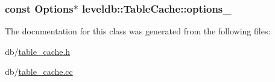 \subsubsection[{options\+\_\+}]{\setlength{\rightskip}{0pt plus 5cm}const {\bf Options}$\ast$ leveldb\+::\+Table\+Cache\+::options\+\_\+\hspace{0.3cm}{\ttfamily [private]}}\label{classleveldb_1_1_table_cache_ad24157b076d23fc18fe90d530241fd23}


The documentation for this class was generated from the following files\+:\begin{DoxyCompactItemize}
\item 
db/\hyperlink{table__cache_8h}{table\+\_\+cache.\+h}\item 
db/\hyperlink{table__cache_8cc}{table\+\_\+cache.\+cc}\end{DoxyCompactItemize}
